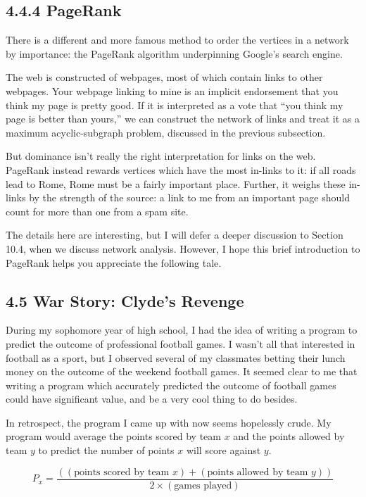 \documentclass[10pt]{article}
\begin{document}
\subsection*{4.4.4 PageRank}
There is a different and more famous method to order the vertices in a network by importance: the PageRank algorithm underpinning Google’s search engine.

The web is constructed of webpages, most of which contain links to other webpages. Your webpage linking to mine is an implicit endorsement that you think my page is pretty good. If it is interpreted as a vote that “you think my page is better than yours,” we can construct the network of links and treat it as a maximum acyclic-subgraph problem, discussed in the previous subsection.

But dominance isn’t really the right interpretation for links on the web. PageRank instead rewards vertices which have the most in-links to it: if all roads lead to Rome, Rome must be a fairly important place. Further, it weighs these in-links by the strength of the source: a link to me from an important page should count for more than one from a spam site.

The details here are interesting, but I will defer a deeper discussion to Section 10.4, when we discuss network analysis. However, I hope this brief introduction to PageRank helps you appreciate the following tale.

\subsection*{4.5 War Story: Clyde’s Revenge}
During my sophomore year of high school, I had the idea of writing a program to predict the outcome of professional football games. I wasn’t all that interested in football as a sport, but I observed several of my classmates betting their lunch money on the outcome of the weekend football games. It seemed clear to me that writing a program which accurately predicted the outcome of football games could have significant value, and be a very cool thing to do besides.

In retrospect, the program I came up with now seems hopelessly crude. My program would average the points scored by team \(x\) and the points allowed by team \(y\) to predict the number of points \(x\) will score against \(y\).

\[ P_x = \frac{((\text{points scored by team } x) + (\text{points allowed by team } y))}{2 \times (\text{games played})} \]
\end{document}
